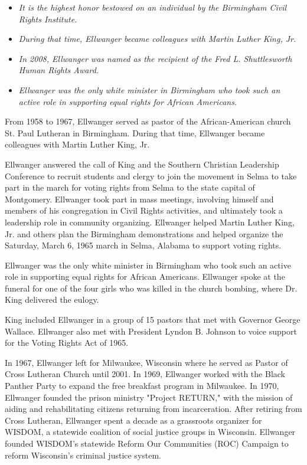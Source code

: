 \begin{itemize}
\item
  \emph{It is the highest honor bestowed on an individual by the
  Birmingham Civil Rights Institute.}
\item
  \emph{During that time, Ellwanger became colleagues with Martin Luther
  King, Jr.}
\item
  \emph{In 2008, Ellwanger was named as the recipient of the Fred L.
  Shuttlesworth Human Rights Award.}
\item
  \emph{Ellwanger was the only white minister in Birmingham who took
  such an active role in supporting equal rights for African Americans.}
\end{itemize}

From 1958 to 1967, Ellwanger served as pastor of the African-American
church St. Paul Lutheran in Birmingham. During that time, Ellwanger
became colleagues with Martin Luther King, Jr.

Ellwanger answered the call of King and the Southern Christian
Leadership Conference to recruit students and clergy to join the
movement in Selma to take part in the march for voting rights from Selma
to the state capital of Montgomery. Ellwanger took part in mass
meetings, involving himself and members of his congregation in Civil
Rights activities, and ultimately took a leadership role in community
organizing. Ellwanger helped Martin Luther King, Jr. and others plan the
Birmingham demonstrations and helped organize the Saturday, March 6,
1965 march in Selma, Alabama to support voting rights.

Ellwanger was the only white minister in Birmingham who took such an
active role in supporting equal rights for African Americans. Ellwanger
spoke at the funeral for one of the four girls who was killed in the
church bombing, where Dr. King delivered the eulogy.

King included Ellwanger in a group of 15 pastors that met with Governor
George Wallace. Ellwanger also met with President Lyndon B. Johnson to
voice support for the Voting Rights Act of 1965.

In 1967, Ellwanger left for Milwaukee, Wisconsin where he served as
Pastor of Cross Lutheran Church until 2001. In 1969, Ellwanger worked
with the Black Panther Party to expand the free breakfast program in
Milwaukee. In 1970, Ellwanger founded the prison ministry "Project
RETURN," with the mission of aiding and rehabilitating citizens
returning from incarceration. After retiring from Cross Lutheran,
Ellwanger spent a decade as a grassroots organizer for WISDOM, a
statewide coalition of social justice groups in Wisconsin. Ellwanger
founded WISDOM's statewide Reform Our Communities (ROC) Campaign to
reform Wisconsin's criminal justice system.

